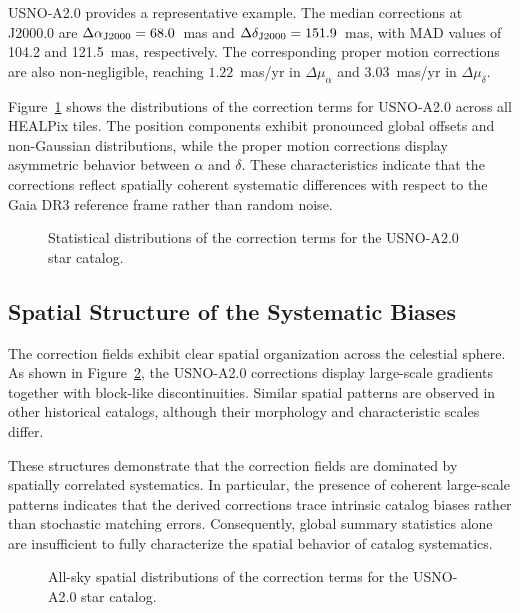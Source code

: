 \documentclass[linenumbers,amsmath,manuscript]{aastex702}
\begin{document}
USNO-A2.0 provides a representative example. The median corrections at J2000.0 are $\Delta\alpha_{\rm J2000} = 68.0$~mas and $\Delta\delta_{\rm J2000} = 151.9$~mas, with MAD values of 104.2 and 121.5~mas, respectively. The corresponding proper motion corrections are also non-negligible, reaching $1.22$~mas/yr in $\Delta\mu_{\alpha}$ and $3.03$~mas/yr in $\Delta\mu_{\delta}$.

Figure~\ref{fig:hist_usnoa2} shows the distributions of the correction terms for USNO-A2.0 across all HEALPix tiles. The position components exhibit pronounced global offsets and non-Gaussian distributions, while the proper motion corrections display asymmetric behavior between $\alpha$ and $\delta$. These characteristics indicate that the corrections reflect spatially coherent systematic differences with respect to the Gaia DR3 reference frame rather than random noise.

\begin{figure}[ht!]
\caption{Statistical distributions of the correction terms for the USNO-A2.0 star catalog.}
\label{fig:hist_usnoa2}
\end{figure}

\subsection{Spatial Structure of the Systematic Biases} \label{subsec:spatial}

The correction fields exhibit clear spatial organization across the celestial sphere. As shown in Figure~\ref{fig:bias_usno_a2_2x2}, the USNO-A2.0 corrections display large-scale gradients together with block-like discontinuities. Similar spatial patterns are observed in other historical catalogs, although their morphology and characteristic scales differ.

These structures demonstrate that the correction fields are dominated by spatially correlated systematics. In particular, the presence of coherent large-scale patterns indicates that the derived corrections trace intrinsic catalog biases rather than stochastic matching errors. Consequently, global summary statistics alone are insufficient to fully characterize the spatial behavior of catalog systematics.

\begin{figure}[ht!]
\caption{All-sky spatial distributions of the correction terms for the USNO-A2.0 star catalog.}
\label{fig:bias_usno_a2_2x2}
\end{figure}
\end{document}
